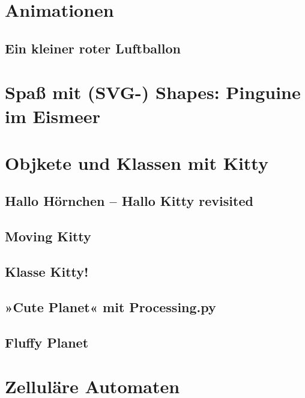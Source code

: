 \documentclass[10pt,german,]{book}
\begin{document}
\chapter{Animationen}\label{animationen}

\section{Ein kleiner roter
Luftballon}\label{ein-kleiner-roter-luftballon}

\chapter{Spaß mit (SVG-) Shapes: Pinguine im
Eismeer}\label{spauxdf-mit-svg--shapes-pinguine-im-eismeer}

\chapter{Objkete und Klassen mit
Kitty}\label{objkete-und-klassen-mit-kitty}

\section{Hallo Hörnchen -- Hallo Kitty
revisited}\label{hallo-huxf6rnchen-hallo-kitty-revisited}

\section{Moving Kitty}\label{moving-kitty}

\section{Klasse Kitty!}\label{klasse-kitty}

\section{»Cute Planet« mit
Processing.py}\label{cute-planet-mit-processing.py}

\section{Fluffy Planet}\label{fluffy-planet}

\chapter{Zelluläre Automaten}\label{zelluluxe4re-automaten}
\end{document}
